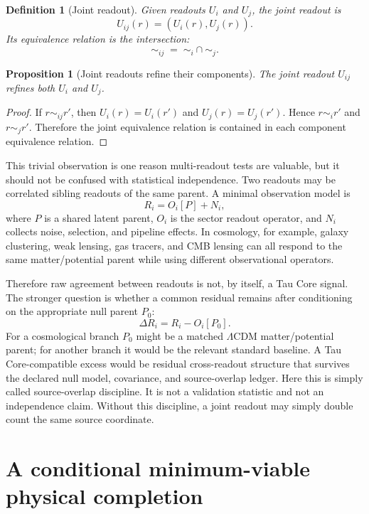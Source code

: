 \documentclass[11pt]{article}
\newtheorem{definition}{Definition}
\newtheorem{proposition}{Proposition}
\begin{document}
\begin{definition}[Joint readout]
Given readouts \(U_i\) and \(U_j\), the joint readout is
\[
  U_{ij}(r)=(U_i(r),U_j(r)).
\]
Its equivalence relation is the intersection:
\[
  \sim_{ij} \;=\; \sim_i \cap \sim_j.
\]
\end{definition}

\begin{proposition}[Joint readouts refine their components]
The joint readout \(U_{ij}\) refines both \(U_i\) and \(U_j\).
\end{proposition}

\begin{proof}
If \(r\sim_{ij}r'\), then \(U_i(r)=U_i(r')\) and \(U_j(r)=U_j(r')\).  Hence
\(r\sim_i r'\) and \(r\sim_j r'\).  Therefore the joint equivalence relation
is contained in each component equivalence relation.
\end{proof}

This trivial observation is one reason multi-readout tests are valuable, but
it should not be confused with statistical independence.  Two readouts may be
correlated sibling readouts of the same parent.  A minimal observation model is
\[
  R_i=O_i[P]+N_i,
\]
where \(P\) is a shared latent parent, \(O_i\) is the sector readout operator,
and \(N_i\) collects noise, selection, and pipeline effects.  In cosmology, for
example, galaxy clustering, weak lensing, gas tracers, and CMB lensing can all
respond to the same matter/potential parent while using different observational
operators.

Therefore raw agreement between readouts is not, by itself, a Tau Core signal.
The stronger question is whether a common residual remains after conditioning
on the appropriate null parent \(P_0\):
\[
  \Delta R_i=R_i-O_i[P_0].
\]
For a cosmological branch \(P_0\) might be a matched \(\Lambda\)CDM
matter/potential parent; for another branch it would be the relevant standard
baseline.  A Tau Core-compatible excess would be residual cross-readout
structure that survives the declared null model, covariance, and
source-overlap ledger.  Here this is simply called source-overlap discipline.
It is not a validation statistic and not an independence claim.
Without this discipline, a joint readout may simply double count the same
source coordinate.

\section{A conditional minimum-viable physical completion}
\label{sec:mvp}
\end{document}
